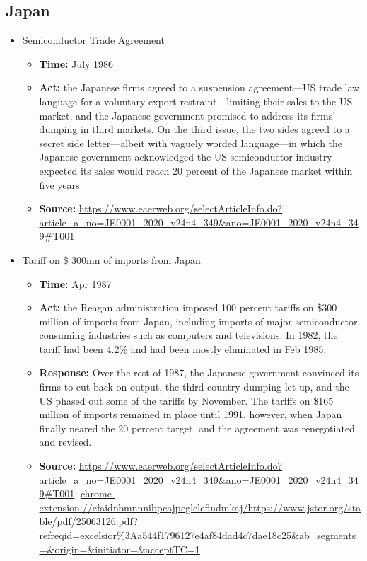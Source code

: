 	\subsection{Japan}
		\begin{itemize}
		\item	Semiconductor Trade Agreement
			\begin{itemize}
			\item \textbf{Time: }July 1986
			\item \textbf{Act: }the Japanese firms agreed to a suspension agreement—US trade law language for a voluntary export restraint—limiting their sales to the US market, and the Japanese government promised to address its firms’ dumping in third markets. On the third issue, the two sides agreed to a secret side letter—albeit with vaguely worded language—in which the Japanese government acknowledged the US semiconductor industry expected its sales would reach 20 percent of the Japanese market within five years
			\item	\textbf{Source: }\url{https://www.eaerweb.org/selectArticleInfo.do?article_a_no=JE0001_2020_v24n4_349\&ano=JE0001_2020_v24n4_349#T001}
			\end{itemize}
			
		\item Tariff on \$ 300mn of imports from Japan
			\begin{itemize}
			\item \textbf{Time: }Apr 1987
			\item \textbf{Act: }the Reagan administration imposed 100 percent tariffs on \$300 million of imports from Japan, including imports of major semiconductor consuming industries such as computers and televisions. In 1982, the tariff had been 4.2\% and had been mostly eliminated in Feb 1985. 
			\item \textbf{Response: }Over the rest of 1987, the Japanese government convinced its firms to cut back on output, the third-country dumping let up, and the US phased out some of the tariffs by November. The tariffs on \$165 million of imports remained in place until 1991, however, when Japan finally neared the 20 percent target, and the agreement was renegotiated and revised.
			\item	\textbf{Source: }\url{https://www.eaerweb.org/selectArticleInfo.do?article_a_no=JE0001_2020_v24n4_349\&ano=JE0001_2020_v24n4_349#T001}; \url{chrome-extension://efaidnbmnnnibpcajpcglclefindmkaj/https://www.jstor.org/stable/pdf/25063126.pdf?refreqid=excelsior\%3Aa544f1796127e4af84dad4c7dae18c25\&ab_segments=\&origin=\&initiator=\&acceptTC=1}
			\end{itemize}
		\end{itemize}
		
